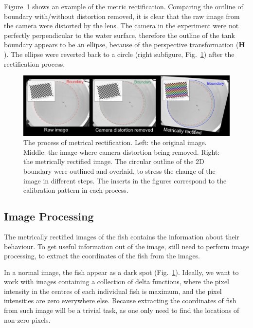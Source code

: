 \documentclass[11pt,twoside]{report}
\begin{document}
Figure~\ref{fig:metric-rectify} shows an example of the metric rectification. Comparing the outline of boundary with/without distortion removed, it is clear that the raw image from the camera were distorted by the lens. The camera in the experiment were not perfectly perpendicular to the water surface, therefore the outline of the tank boundary appears to be an ellipse, because of the perspective transformation ($\mathbf{H}$). The ellipse were reverted back to a circle (right subfigure, Fig.~\ref{fig:metric-rectify}) after the rectification process.


\begin{figure}
  \includegraphics[width=\linewidth]{image-calib-2d.png}
  \caption[Metrical rectification of an image.]{
  	The process of metrical rectification. Left: the original image. Middle: the image where camera distortion being removed. Right: the metrically rectified image. The circular outline of the 2D boundary were outlined and overlaid, to stress the change of the image in different steps. The inserts in the figures correspond to the calibration pattern in each process.
  }
  \label{fig:metric-rectify}
\end{figure}

\subsection{Image Processing}
\label{section:image_process}

The metrically rectified images of the fish contains the information about their behaviour.
To get useful information out of the image, still need to perform image processing, to extract the coordinates of the fish from the images.

In a normal image, the fish appear as a dark spot (Fig.~\ref{fig:metric-rectify}). 
Ideally, we want to work with images containing a collection of delta functions, where the pixel intensity in the centres of each individual fish is maximum, and the pixel intensities are zero everywhere else. Because extracting the coordinates of fish from such image will be a trivial task, as one only need to find the locations of non-zero pixels.
\end{document}

